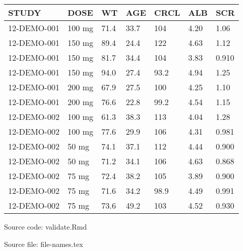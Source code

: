 {\def\arraystretch{1.4}\tabcolsep=5pt
\begin{threeparttable}
\begin{tabular}[h]{lllllll}
\hline
STUDY & DOSE & WT & AGE & CRCL & ALB & SCR \\
\hline
12-DEMO-001 & 100 mg & 71.4 & 33.7 & 104 & 4.20 & 1.06 \\
12-DEMO-001 & 150 mg & 89.4 & 24.4 & 122 & 4.63 & 1.12 \\
12-DEMO-001 & 150 mg & 81.7 & 34.4 & 104 & 3.83 & 0.910 \\
12-DEMO-001 & 150 mg & 94.0 & 27.4 & 93.2 & 4.94 & 1.25 \\
12-DEMO-001 & 200 mg & 67.9 & 27.5 & 100 & 4.25 & 1.10 \\
12-DEMO-001 & 200 mg & 76.6 & 22.8 & 99.2 & 4.54 & 1.15 \\
12-DEMO-002 & 100 mg & 61.3 & 38.3 & 113 & 4.04 & 1.28 \\
12-DEMO-002 & 100 mg & 77.6 & 29.9 & 106 & 4.31 & 0.981 \\
12-DEMO-002 & 50 mg & 74.1 & 37.1 & 112 & 4.44 & 0.900 \\
12-DEMO-002 & 50 mg & 71.2 & 34.1 & 106 & 4.63 & 0.868 \\
12-DEMO-002 & 75 mg & 72.4 & 38.2 & 105 & 3.89 & 0.900 \\
12-DEMO-002 & 75 mg & 71.6 & 34.2 & 98.9 & 4.49 & 0.991 \\
12-DEMO-002 & 75 mg & 73.6 & 49.2 & 103 & 4.52 & 0.930 \\
\hline
\end{tabular}
\begin{tablenotes}[flushleft]
\item Source code: validate.Rmd
\item Source file: file-names.tex
\end{tablenotes}
\end{threeparttable}
}
